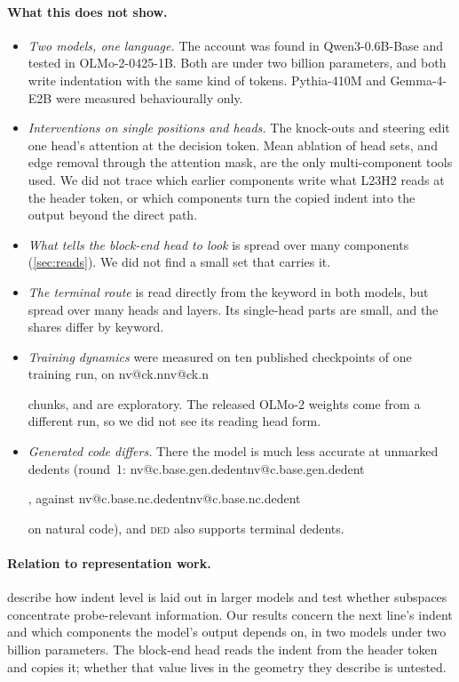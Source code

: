 \documentclass[11pt]{article}
\makeatletter
\newcommand{\nv}[1]{\ifcsname nv@#1\endcsname\csname nv@#1\endcsname\else\PackageError{numbers}{Unknown number key #1}{}\fi}
\newcommand{\qw}{Qwen3-0.6B-Base}
\newcommand{\hd}[2]{L#1H#2}
\newcommand{\ded}{\textsc{ded}}
\makeatother
\begin{document}
\paragraph{What this does not show.}
\begin{itemize}
\item \emph{Two models, one language.} The account was found in \qw{} and tested in OLMo-2-0425-1B. Both are under two billion parameters, and both write indentation with the same kind of tokens. Pythia-410M and Gemma-4-E2B were measured behaviourally only.
\item \emph{Interventions on single positions and heads.} The knock-outs and steering edit one head's attention at the decision token. Mean ablation of head sets, and edge removal through the attention mask, are the only multi-component tools used. We did not trace which earlier components write what \hd{23}{2} reads at the header token, or which components turn the copied indent into the output beyond the direct path.
\item \emph{What tells the block-end head to look} is spread over many components (\cref{sec:reads}). We did not find a small set that carries it.
\item \emph{The terminal route} is read directly from the keyword in both models, but spread over many heads and layers. Its single-head parts are small, and the shares differ by keyword.
\item \emph{Training dynamics} were measured on ten published checkpoints of one training run, on \nv{ck.n} chunks, and are exploratory. The released OLMo-2 weights come from a different run, so we did not see its reading head form.
\item \emph{Generated code differs.} There the model is much less accurate at unmarked dedents (round~1: \nv{c.base.gen.dedent}, against \nv{c.base.nc.dedent} on natural code), and \ded{} also supports terminal dedents.
\end{itemize}

\paragraph{Relation to representation work.} \citet{bassi2026geometry} describe how indent level is laid out in larger models and test whether subspaces concentrate probe-relevant information. Our results concern the next line's indent and which components the model's output depends on, in two models under two billion parameters. The block-end head reads the indent from the header token and copies it; whether that value lives in the geometry they describe is untested.
\end{document}
